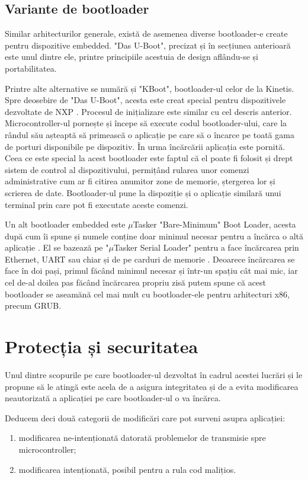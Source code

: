 \documentclass[12pt,a4paper,titlepage]{report}
\begin{document}
\subsection{Variante de bootloader}

Similar arhitecturilor generale, există de asemenea diverse bootloader-e create pentru dispozitive embedded. "Das U-Boot", precizat și în secțiunea anterioară este unul dintre ele, printre principiile acestuia de design aflându-se și portabilitatea.

Printre alte alternative se numără și "KBoot", bootloader-ul celor de la Kinetis. Spre deosebire de "Das U-Boot", acesta este creat special pentru dispozitivele dezvoltate de NXP \cite{kboot}. Procesul de inițializare este similar cu cel descris anterior. Microcontroller-ul pornește și începe să execute codul bootloader-ului, care la rândul său așteaptă să primească o aplicație pe care să o încarce pe toată gama de porturi disponibile pe dispozitiv. În urma încărcării aplicația este pornită. Ceea ce este special la acest bootloader este faptul că el poate fi folosit și drept sistem de control al dispozitivului, permițând rularea unor comenzi administrative cum ar fi citirea anumitor zone de memorie, ștergerea lor și scrierea de date. Bootloader-ul pune la dispoziție și o aplicație similară unui terminal prin care pot fi executate aceste comenzi.

Un alt bootloader embedded este \guillemotleft$\mu$Tasker "Bare-Minimum" Boot Loader\guillemotright, acesta după cum îi spune și numele conține doar minimul necesar pentru a încărca o altă aplicație \cite{uTaskerMinim}. El se bazează pe "$\mu$Tasker Serial Loader" pentru a face încărcarea prin Ethernet, UART sau chiar și de pe carduri de memorie \cite{uTaskerSerial}. Deoarece  încărcarea se face în doi pași, primul făcând minimul necesar și într-un spațiu cât mai mic, iar cel de-al doilea pas făcând încărcarea propriu zisă putem spune că acest bootloader se aseamănă cel mai mult cu bootloader-ele pentru arhitecturi x86, precum GRUB.

\section{Protecția și securitatea}
Unul dintre scopurile pe care bootloader-ul dezvoltat în cadrul acestei lucrări și le propune să le atingă este acela de a asigura integritatea și de a evita modificarea neautorizată a aplicației pe care bootloader-ul o va încărca.

Deducem deci două categorii de modificări care pot surveni asupra aplicației:
\begin{enumerate}
\item modificarea ne-intenționată datorată problemelor de transmisie spre microcontroller;
\item modificarea intenționată, posibil pentru a rula cod malițios.
\end{enumerate}
\end{document}
